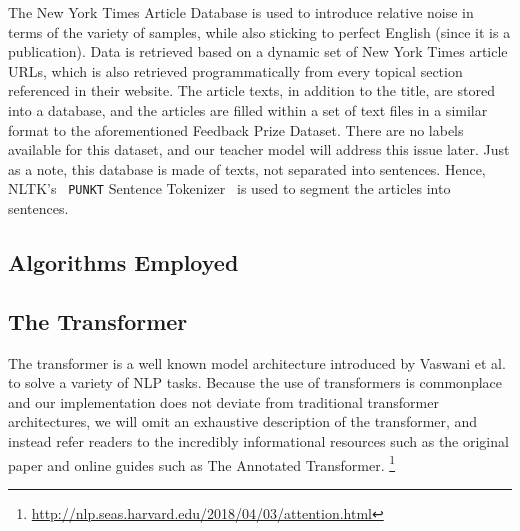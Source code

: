 \documentclass[12pt]{article}
\begin{document}
{The New York Times Article Database is used to introduce relative noise in terms of the variety of samples, while also sticking to perfect English (since it is a publication). Data is retrieved based on a dynamic set of New York Times article URLs, which is also retrieved programmatically from every topical section referenced in their website. The article texts, in addition to the title, are stored into a database, and the articles are filled within a set of text files in a similar format to the aforementioned Feedback Prize Dataset. There are no labels available for this dataset, and our teacher model will address this issue later. Just as a note, this database is made of texts, not separated into sentences. Hence, NLTK's~\cite{nltk} \texttt{PUNKT} Sentence Tokenizer~\cite{punkt} is used to segment the articles into sentences.

\subsection{Algorithms Employed}

\subsection{The Transformer}
The transformer is a well known model architecture introduced by Vaswani et al.\cite{transformer} to solve a variety of NLP tasks. Because the use of transformers is commonplace and our implementation does not deviate from traditional transformer architectures, we will omit an exhaustive description of the transformer, and instead refer readers to the incredibly informational resources such as the original paper \cite{transformer} and online guides such as The Annotated Transformer. \footnote{\url{http://nlp.seas.harvard.edu/2018/04/03/attention.html}}


}
\end{document}
